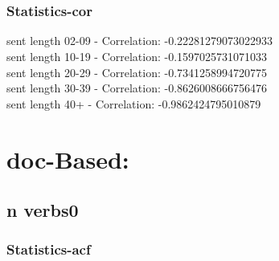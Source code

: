 \documentclass{article}%
\begin{document}
\begin{figure}[ht]%
\centering%
\setlength{\abovecaptionskip}{-35pt}%
%
%
\\%
%
%
\\%
%
\end{figure}

%
\newpage%
\subsubsection{Statistics{-}cor}%
\label{ssubsec:Statistics{-}cor}%
\noindent%
sent length 02-09 - Correlation: -0.22281279073022933\\%
sent length 10-19 - Correlation: -0.1597025731071033\\%
sent length 20-29 - Correlation: -0.7341258994720775\\%
sent length 30-39 - Correlation: -0.8626008666756476\\%
sent length 40+ - Correlation: -0.9862424795010879\\

%
\newpage

%
\section{doc{-}Based:}%
\label{sec:doc{-}Based}%
\subsection{n verbs0}%
\label{subsec:nverbs0}%
\subsubsection{Statistics{-}acf}%
\label{ssubsec:Statistics{-}acf}%
\end{document}
